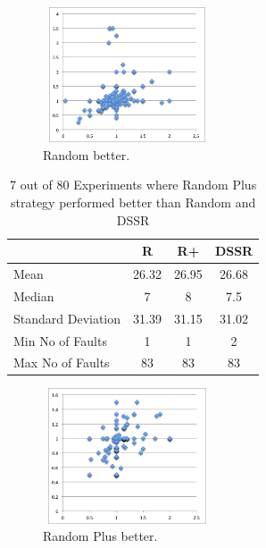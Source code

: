 \documentclass[conference]{IEEEtran}
\begin{document}
\begin{figure}[ht]
\centering
\includegraphics[width=5cm,height=4cm]{Randombetter5.png}
\caption{Random better.}
\label{fig:Randombetter}
\end{figure}




\begin{table}[H]
\caption{7 out of 80 Experiments where Random Plus strategy performed better than Random and DSSR}
\centering
\begin{tabular}{|l|c|c|c|}
\hline\hline
 				& R			& R+				&  DSSR 	\\
\hline
Mean  			&    26.32		&  26.95			&  26.68\\
Median 			&    7 		&  8	 			&  7.5 \\
Standard Deviation 	&    31.39		&  31.15			&  31.02\\
Min No of Faults	&    1			&  1				&  2\\
Max No of Faults 	&    83		&  83				&  83\\
\hline
\end{tabular}
\label{table:RandomPlusbetter}
\end{table}


\begin{figure}[H]
\centering
\includegraphics[width=5cm,height=4cm]{RandomPlusbetter5.png}
\caption{Random Plus better.}
\label{fig:RandomPlusbetter}
\end{figure}



\end{document}
